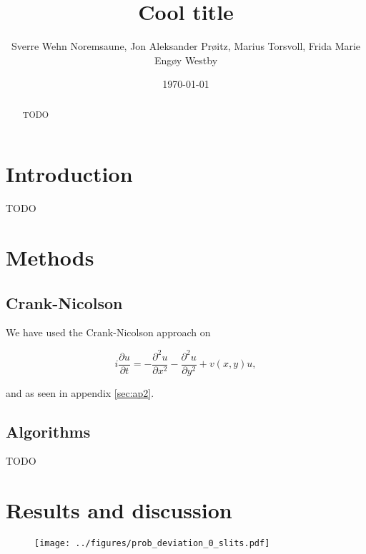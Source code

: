 \documentclass[english,notitlepage,reprint,nofootinbib]{revtex4-1}  %
\begin{document}
	
\title{Cool title}  %
\author{Sverre Wehn Noremsaune, Jon Aleksander Prøitz, Marius Torsvoll, Frida Marie Engøy Westby} %
\date{\today}                             %
\noaffiliation                            %

\begin{abstract}
    TODO
\end{abstract}
\maketitle
	
	
\section{Introduction}
%
TODO


\section{Methods}\label{sec:methods}
%
\subsection{Crank-Nicolson}
We have used the Crank-Nicolson approach on

\begin{equation} \label{eq:partial}
    i \frac{\partial u}{\partial t} = - \frac{\partial^2 u}{\partial x^2} - \frac{\partial^2 u}{\partial y^2} + v(x,y)u,
\end{equation}

and as seen in appendix \ref{sec:ap2}.

\subsection*{Algorithms}
%
TODO


\section{Results and discussion}\label{sec:results}
%
\begin{figure}[H]
	\centering
	\texttt{[image: ../figures/prob\_deviation\_0\_slits.pdf]} %
	\caption{}
	\label{fig:dev_0_slits}
\end{figure}
\end{document}
